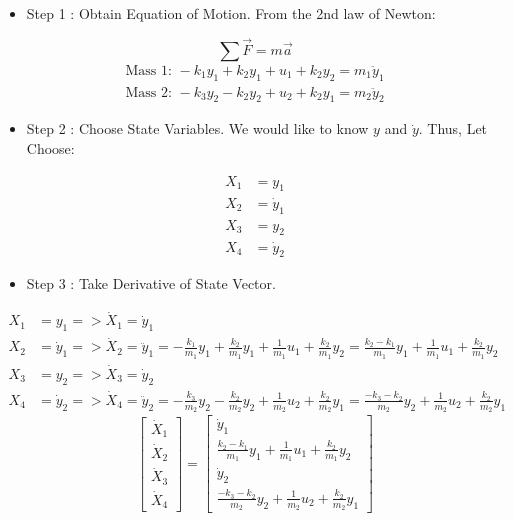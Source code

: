 \begin{itemize}
	\item Step 1 : Obtain Equation of Motion. From the 2nd law of Newton:
\end{itemize}
\[
\sum \vec{F} = m\vec{a}
\]
\[
\begin{split}
	\text{Mass 1: } -k_1y_1 + k_2y_1 + u_1 + k_2y_2 = m_1\ddot{y}_1 \\
	\text{Mass 2: } -k_3y_2 - k_2y_2 + u_2 + k_2y_1 = m_2\ddot{y}_2
\end{split}
\]
\begin{itemize}
	\item Step 2 : Choose State Variables. We would like to know \(y\) and \(\dot{y}\). Thus, Let Choose:
\end{itemize}
\[
\begin{split}
	X_1 &= y_1 \\
	X_2 &= \dot{y}_1 \\
	X_3 &= y_2 \\
	X_4 &= \dot{y}_2
\end{split}
\]
\begin{itemize}
	\item Step 3 : Take Derivative of State Vector.
\end{itemize}
\[
\begin{split}
	X_1 &= y_1 => \dot{X}_1 = \dot{y}_1 \\
	X_2 &= \dot{y}_1 => \dot{X}_2 = \ddot{y}_1 = -\frac{k_1}{m_1}y_1 + \frac{k_2}{m_1}y_1 + \frac{1}{m_1}u_1 + \frac{k_2}{m_1}y_2 = \frac{k_2 - k_1}{m_1}y_1 + \frac{1}{m_1}u_1 + \frac{k_2}{m_1}y_2 \\
	X_3 &= y_2 => \dot{X}_3 = \dot{y}_2 \\ 
	X_4 &= \dot{y}_2 => \dot{X}_4 = \ddot{y}_2 = -\frac{k_3}{m_2}y_2 - \frac{k_2}{m_2}y_2 + \frac{1}{m_2}u_2 + \frac{k_2}{m_2}y_1 = \frac{-k_3 - k_2}{m_2}y_2 + \frac{1}{m_2}u_2 + \frac{k_2}{m_2}y_1
\end{split}
\]
\[
\begin{bmatrix}
	\dot{X}_1 \\
	\dot{X}_2 \\
	\dot{X}_3 \\
	\dot{X}_4 
\end{bmatrix} =
\begin{bmatrix}
	\dot{y}_1                                                         \\
	\frac{k_2 - k_1}{m_1}y_1 + \frac{1}{m_1}u_1 + \frac{k_2}{m_1}y_2  \\
	\dot{y}_2                                                         \\
	\frac{-k_3 - k_2}{m_2}y_2 + \frac{1}{m_2}u_2 + \frac{k_2}{m_2}y_1 
\end{bmatrix}
\]
